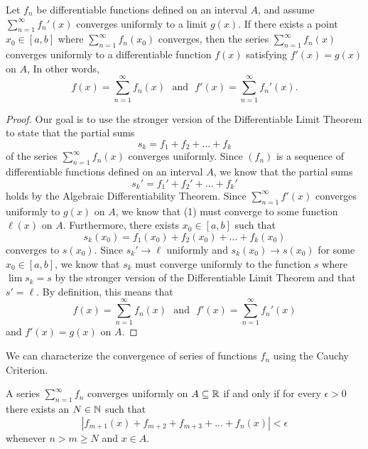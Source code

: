 \begin{theorem}
        Let \( f_n  \) be differentiable functions defined on an interval \( A  \), and assume \( \sum_{ n=1 }^{ \infty  } f_n'(x)  \) converges uniformly to a limit \( g(x) \). If there exists a point \( x_0 \in [a,b]  \) where \( \sum_{ n=1 }^{ \infty  } f_n(x_0)  \) converges, then the series \( \sum_{ n=1 }^{ \infty  } f_n(x)  \) converges uniformly to a differentiable function \( f(x)  \) satisfying \( f'(x)  = g(x)  \) on \( A  \), In other words, 
        \[  f(x) = \sum_{ n=1 }^{ \infty  } f_n(x) \text{ ~and~ } f'(x) = \sum_{ n=1 }^{ \infty  } f_n'(x).  \] 
    \end{theorem}

\begin{proof}
Our goal is to use the stronger version of the Differentiable Limit Theorem to state that the partial sums 
\[  s_k = f_1 + f_2 + \dots + f_k  \]
of the series \( \sum_{ n=1 }^{ \infty  } f_n(x)  \) converges uniformly. Since \( (f_n)  \) is a sequence of differentiable functions defined on an interval \( A  \), we know that the partial sums 
\[  s_k' = f_1'  + f_2' + \dots + f_k' \tag{1}\]
holds by the Algebraic Differentiability Theorem. Since \( \sum_{ n=1 }^{ \infty  } f'(x) \) converges uniformly to \( g(x)  \) on \( A  \), we know that (1) must converge to some function \( \ell(x)  \) on \( A  \). Furthermore, there exists \(  x_0 \in [a,b] \) such that 
\[  s_k(x_0)  = f_1(x_0) + f_2(x_0) + \dots + f_k(x_0) \] converges to \( s(x_0)  \).
Since \( s_k' \to \ell \) uniformly and \( s_k(x_0) \to s(x_0)  \) for some \( x_0 \in [a,b]  \), we know that \( s_k  \) must converge uniformly to the function \( s  \) where \( \lim s_k = s  \) by the stronger version of the Differentiable Limit Theorem and that \( s' = \ell  \). By definition, this means that 
\[  f(x) = \sum_{ n=1 }^{ \infty  } f_n(x) \text{ ~and~ } f'(x) = \sum_{ n=1 }^{ \infty  } f_n'(x) \]
and \( f'(x) = g(x)  \) on \( A  \).
\end{proof}

We can characterize the convergence of series of functions \( f_n \) using the Cauchy Criterion.

\begin{theorem}
    A series \( \sum_{ n=1 }^{ \infty  } f_n  \) converges uniformly on \( A \subseteq \mathbb{R}  \) if and only if for every \( \epsilon > 0  \) there exists an \( N \in \mathbb{N}  \) such that 
    \[  | f_{m+1}(x) + f_{m+2} + f_{m+3} + \dots + f_n(x)  | < \epsilon \]
    whenever \( n > m \geq N  \) and \( x \in A  \).
    \end{theorem}


